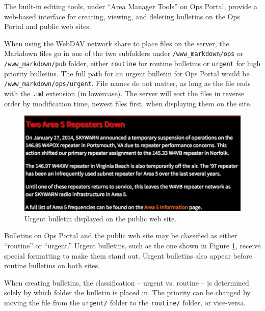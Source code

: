\documentclass[pdflatex,letterpaper,twoside,12pt]{book}
\begin{document}
The built-in editing tools, under ``Area Manager Tools'' on Ops Portal, provide a web-based interface for creating, viewing, and deleting bulletins on the Ops Portal and public web sites.


When using the WebDAV network share to place files on the server, the Markdown files go in one of the two subfolders under \texttt{/www\_markdown/ops} or \texttt{/www\_markdown/pub} folder, either \texttt{routine} for routine bulletins or \texttt{urgent} for high priority bulletins.  The full path for an urgent bulletin for Ops Portal would be \texttt{/www\_markdown/ops/urgent}.  File names do not matter, as long as the file ends with the \texttt{.md} extension (in lowercase).  The server will sort the files in reverse order by modification time, newest files first, when displaying them on the site.

\begin{figure}[t]
  \centering
  \includegraphics[width=\textwidth,keepaspectratio=true]{img/urgent-bulletin}
  \caption{Urgent bulletin displayed on the public web site.\label{fig:urgent-bulletin}}
\end{figure}

Bulletins on Ops Portal and the public web site may be classified as either ``routine'' or ``urgent.''  Urgent bulletins, such as the one shown in Figure \ref{fig:urgent-bulletin}, receive special formatting to make them stand out.  Urgent bulletins also appear before routine bulletins on both sites.

When creating bulletins, the classification -- urgent vs. routine -- is determined solely by which folder the bulletin is placed in.  The priority can be changed by moving the file from the \texttt{urgent/} folder to the \texttt{routine/} folder, or vice-versa.
\end{document}
